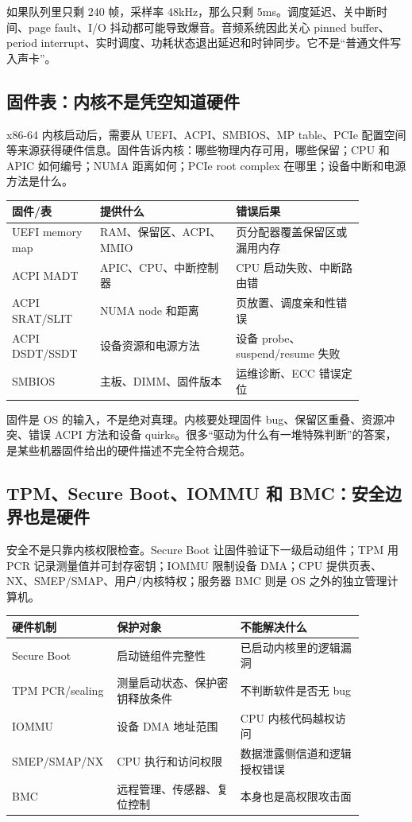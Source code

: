 如果队列里只剩 240 帧，采样率 48kHz，那么只剩 5ms。调度延迟、关中断时间、page fault、I/O 抖动都可能导致爆音。音频系统因此关心 pinned buffer、period interrupt、实时调度、功耗状态退出延迟和时钟同步。它不是“普通文件写入声卡”。

\subsection{固件表：内核不是凭空知道硬件}

x86-64 内核启动后，需要从 UEFI、ACPI、SMBIOS、MP table、PCIe 配置空间等来源获得硬件信息。固件告诉内核：哪些物理内存可用，哪些保留；CPU 和 APIC 如何编号；NUMA 距离如何；PCIe root complex 在哪里；设备中断和电源方法是什么。

\begin{longtable}{p{0.22\linewidth}p{0.34\linewidth}p{0.32\linewidth}}
\toprule
固件/表 & 提供什么 & 错误后果 \\
\midrule
UEFI memory map & RAM、保留区、ACPI、MMIO & 页分配器覆盖保留区或漏用内存 \\
ACPI MADT & APIC、CPU、中断控制器 & CPU 启动失败、中断路由错 \\
ACPI SRAT/SLIT & NUMA node 和距离 & 页放置、调度亲和性错误 \\
ACPI DSDT/SSDT & 设备资源和电源方法 & 设备 probe、suspend/resume 失败 \\
SMBIOS & 主板、DIMM、固件版本 & 运维诊断、ECC 错误定位 \\
\bottomrule
\end{longtable}

固件是 OS 的输入，不是绝对真理。内核要处理固件 bug、保留区重叠、资源冲突、错误 ACPI 方法和设备 quirks。很多“驱动为什么有一堆特殊判断”的答案，是某些机器固件给出的硬件描述不完全符合规范。

\subsection{TPM、Secure Boot、IOMMU 和 BMC：安全边界也是硬件}

安全不是只靠内核权限检查。Secure Boot 让固件验证下一级启动组件；TPM 用 PCR 记录测量值并可封存密钥；IOMMU 限制设备 DMA；CPU 提供页表、NX、SMEP/SMAP、用户/内核特权；服务器 BMC 则是 OS 之外的独立管理计算机。

\begin{longtable}{p{0.20\linewidth}p{0.34\linewidth}p{0.34\linewidth}}
\toprule
硬件机制 & 保护对象 & 不能解决什么 \\
\midrule
Secure Boot & 启动链组件完整性 & 已启动内核里的逻辑漏洞 \\
TPM PCR/sealing & 测量启动状态、保护密钥释放条件 & 不判断软件是否无 bug \\
IOMMU & 设备 DMA 地址范围 & CPU 内核代码越权访问 \\
SMEP/SMAP/NX & CPU 执行和访问权限 & 数据泄露侧信道和逻辑授权错误 \\
BMC & 远程管理、传感器、复位控制 & 本身也是高权限攻击面 \\
\bottomrule
\end{longtable}

